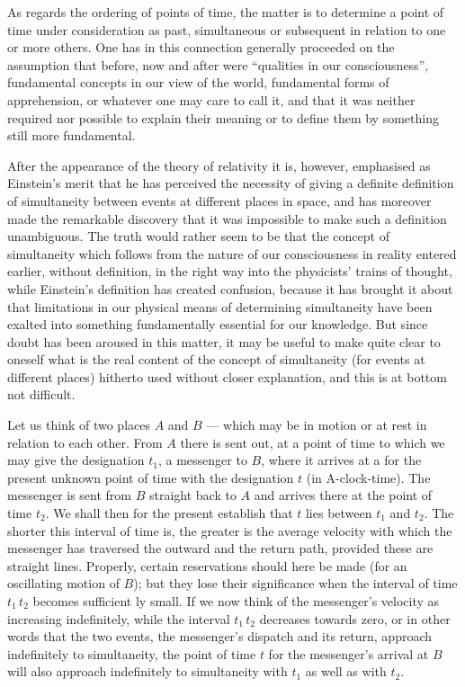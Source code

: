 \documentclass[12pt,a4paper]{article}
\begin{document}
As regards the ordering of points of time, the matter is to determine a point
of time under consideration as past, simultaneous or subsequent in relation to
one or more others. One has in this connection generally proceeded on the
assumption that before, now and after were ``qualities in our consciousness'',
fundamental concepts in our view of the world, fundamental forms of
apprehension, or whatever one may care to call it, and that it was neither
required nor possible to explain their meaning or to define them by something
still more fundamental.

After the appearance of the theory of relativity it is, however, emphasised as
Einstein's merit that he has perceived the necessity of giving a definite
definition of simultaneity between events at different places in space, and
has moreover made the remarkable discovery that it was impossible to make such
a definition unambiguous. The truth would rather seem to be that the concept
of simultaneity which follows from the nature of our consciousness in reality
entered earlier, without definition, in the right way into the physicists'
trains of thought, while Einstein's definition has created confusion, because
it has brought it about that limitations in our physical means of determining
simultaneity have been exalted into something fundamentally essential for our
knowledge. But since doubt has been aroused in this matter, it may be useful
to make quite clear to oneself what is the real content of the concept of
simultaneity (for events at different places) hitherto used without closer
explanation, and this is at bottom not difficult.

Let us think of two places $A$ and $B$ --- which may be in motion or at rest
in relation to each other. From $A$ there is sent out, at a point of time to
which we may give the designation $t_{1}$, a messenger to $B$, where it
arrives at a for the present unknown point of time with the designation $t$
(in A-clock-time). The messenger is sent from $B$ straight back to $A$ and
arrives there at the point of time $t_{2}$. We shall then for the present
establish that $t$ lies between $t_{1}$ and $t_{2}$. The shorter this interval
of time is, the greater is the average velocity with which the messenger has
traversed the outward and the return path, provided these are straight lines.
Properly, certain reservations should here be made (for an oscillating motion
of $B$); but they lose their significance when the interval of time
$t_{1}\,t_{2}$ becomes sufficient\-%
ly small. If we now think of the messenger's velocity as increasing
indefinitely, while the interval $t_{1}\,t_{2}$ decreases towards zero, or in
other words that the two events, the messenger's dispatch and its return,
approach indefinitely to simultaneity, the point of time $t$ for the
messenger's arrival at $B$ will also approach indefinitely to simultaneity
with $t_{1}$ as well as with $t_{2}$.
\end{document}
